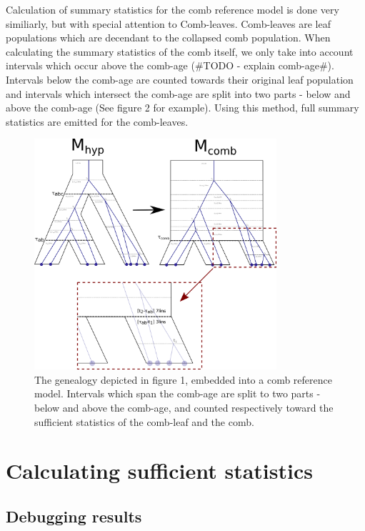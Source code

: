 \documentclass[11pt]{article}
\newcommand{\1}{\mathbbm{1}}
\begin{document}
Calculation of summary statistics for the comb reference model is done very similiarly, but with special attention to Comb-leaves. Comb-leaves are leaf populations which are decendant to the collapsed comb population. When calculating the summary statistics of the comb itself, we only take into account intervals which occur above the comb-age (\#TODO - explain comb-age\#). Intervals below the comb-age are counted towards their original leaf population and intervals which intersect the comb-age are split into two parts - below and above the comb-age (See figure 2 for example). Using this method, full summary statistics are emitted for the comb-leaves.

\begin{figure}[h]
\centering
\includegraphics[width=0.8\textwidth]
{split_interval_on_comb_age}
\caption{The genealogy depicted in figure 1, embedded into a comb reference model. Intervals which span the comb-age are split to two parts - below and above the comb-age, and counted respectively toward the sufficient statistics of the comb-leaf and the comb.}
\end{figure}

\section{Calculating sufficient statistics}


\subsection{Debugging results}
\end{document}
